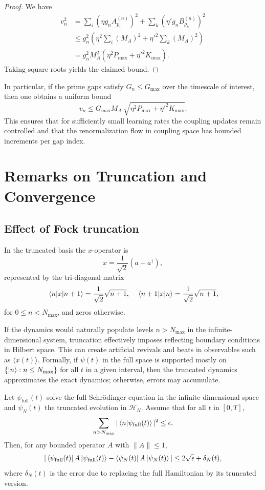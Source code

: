 \documentclass[11pt]{article}
\begin{document}
\begin{proof}
We have
\begin{align*}
v_n^2 &= \sum_i (\eta g_n A_{p_i}^{(n)})^2 + \sum_k (\eta' g_n B_{\rho_k}^{(n)})^2 \\
&\le g_n^2 \left( \eta^2 \sum_i (M_A)^2 + \eta'^2 \sum_k (M_A)^2 \right) \\
&= g_n^2 M_A^2 (\eta^2 P_{\max} + \eta'^2 K_{\max}).
\end{align*}
Taking square roots yields the claimed bound.
\end{proof}

In particular, if the prime gaps satisfy $G_n\le G_{\max}$ over the timescale of interest, then one obtains a uniform bound
\[
v_n \le G_{\max} M_A\, \sqrt{\eta^2 P_{\max} + \eta'^2 K_{\max}}.
\]
This ensures that for sufficiently small learning rates the coupling updates remain controlled and that the renormalization flow in coupling space has bounded increments per gap index.

\section{Remarks on Truncation and Convergence}

\subsection{Effect of Fock truncation}

In the truncated basis the $x$-operator is
\[
x = \frac{1}{\sqrt{2}}(a+a^\dagger),
\]
represented by the tri-diagonal matrix
\[
\mel{n}{x}{n+1} = \frac{1}{\sqrt{2}}\sqrt{n+1},\quad \mel{n+1}{x}{n} = \frac{1}{\sqrt{2}}\sqrt{n+1},
\]
for $0\le n < N_{\max}$, and zeros otherwise.

If the dynamics would naturally populate levels $n>N_{\max}$ in the infinite-dimensional system, truncation effectively imposes reflecting boundary conditions in Hilbert space. This can create artificial revivals and beats in observables such as $\langle x(t)\rangle$. Formally, if $\psi(t)$ in the full space is supported mostly on $\{\ket{n}: n\le N_{\max}\}$ for all $t$ in a given interval, then the truncated dynamics approximates the exact dynamics; otherwise, errors may accumulate.

\begin{lemma}
Let $\psi_{\text{full}}(t)$ solve the full Schr\"odinger equation in the infinite-dimensional space and $\psi_N(t)$ the truncated evolution in $\mathcal{H}_N$. Assume that for all $t$ in $[0,T]$,
\[
\sum_{n>N_{\max}} |\braket{n}{\psi_{\text{full}}(t)}|^2 \le \epsilon.
\]
Then, for any bounded operator $A$ with $\|A\|\le 1$,
\[
|\bra{\psi_{\text{full}}(t)} A \ket{\psi_{\text{full}}(t)} - \bra{\psi_N(t)} A \ket{\psi_N(t)}| \le 2\sqrt{\epsilon} + \delta_N(t),
\]
where $\delta_N(t)$ is the error due to replacing the full Hamiltonian by its truncated version.
\end{lemma}
\end{document}
